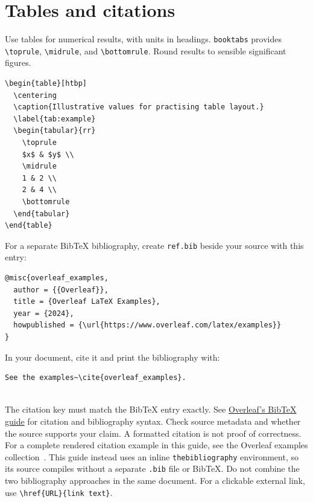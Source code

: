 \documentclass[11pt]{article}
\begin{document}
\section{Tables and citations}
Use tables for numerical results, with units in headings. \texttt{booktabs}
provides \verb|\toprule|, \verb|\midrule|, and \verb|\bottomrule|. Round
results to sensible significant figures.

\begin{lstlisting}
\begin{table}[htbp]
  \centering
  \caption{Illustrative values for practising table layout.}
  \label{tab:example}
  \begin{tabular}{rr}
    \toprule
    $x$ & $y$ \\
    \midrule
    1 & 2 \\
    2 & 4 \\
    \bottomrule
  \end{tabular}
\end{table}
\end{lstlisting}

For a separate BibTeX bibliography, create \texttt{ref.bib} beside your
source with this entry:
\begin{lstlisting}
@misc{overleaf_examples,
  author = {{Overleaf}},
  title = {Overleaf LaTeX Examples},
  year = {2024},
  howpublished = {\url{https://www.overleaf.com/latex/examples}}
}
\end{lstlisting}
In your document, cite it and print the bibliography with:
\begin{lstlisting}
See the examples~\cite{overleaf_examples}.


\end{lstlisting}
The citation key must match the BibTeX entry exactly. See
\href{https://www.overleaf.com/learn/latex/Bibliography_management_with_bibtex}{Overleaf's
BibTeX guide} for citation and bibliography syntax.
Check source metadata and whether the source supports your claim.
A formatted citation is not proof of correctness.
For a complete rendered citation example in this guide, see the
Overleaf examples collection~\cite{overleaf_examples}.
This guide instead uses an inline \texttt{thebibliography} environment, so
its source compiles without a separate \texttt{.bib} file or BibTeX.
Do not combine the two bibliography approaches in the same document.
For a clickable external link, use
\verb|\href{URL}{link text}|.
\end{document}

